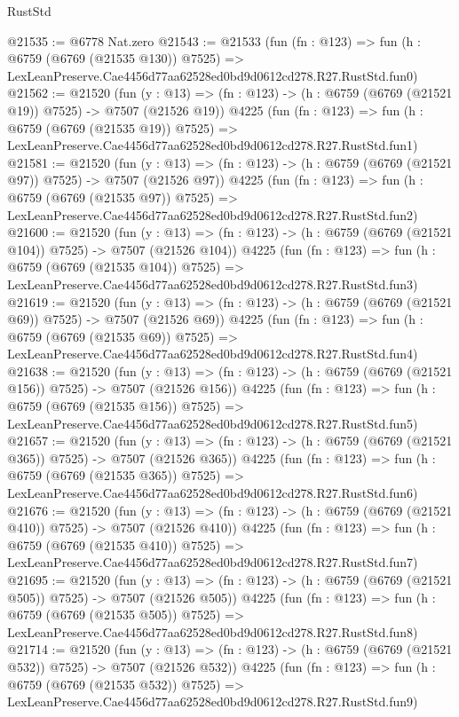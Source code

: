 \begin{lexlean}{RustStd}
\begin{coremodule}
@21535 := @6778 Nat.zero
@21543 := @21533
    (fun (fn : @123) =>
    fun (h : @6759 (@6769 (@21535 @130)) @7525) =>
    LexLeanPreserve.Cae4456d77aa62528ed0bd9d0612cd278.R27.RustStd.fun0)
@21562 := @21520
    (fun (y : @13) => (fn : @123) -> (h : @6759 (@6769 (@21521 @19)) @7525) -> @7507 (@21526 @19))
    @4225
    (fun (fn : @123) =>
    fun (h : @6759 (@6769 (@21535 @19)) @7525) =>
    LexLeanPreserve.Cae4456d77aa62528ed0bd9d0612cd278.R27.RustStd.fun1)
@21581 := @21520
    (fun (y : @13) => (fn : @123) -> (h : @6759 (@6769 (@21521 @97)) @7525) -> @7507 (@21526 @97))
    @4225
    (fun (fn : @123) =>
    fun (h : @6759 (@6769 (@21535 @97)) @7525) =>
    LexLeanPreserve.Cae4456d77aa62528ed0bd9d0612cd278.R27.RustStd.fun2)
@21600 := @21520
    (fun (y : @13) => (fn : @123) -> (h : @6759 (@6769 (@21521 @104)) @7525) -> @7507 (@21526 @104))
    @4225
    (fun (fn : @123) =>
    fun (h : @6759 (@6769 (@21535 @104)) @7525) =>
    LexLeanPreserve.Cae4456d77aa62528ed0bd9d0612cd278.R27.RustStd.fun3)
@21619 := @21520
    (fun (y : @13) => (fn : @123) -> (h : @6759 (@6769 (@21521 @69)) @7525) -> @7507 (@21526 @69))
    @4225
    (fun (fn : @123) =>
    fun (h : @6759 (@6769 (@21535 @69)) @7525) =>
    LexLeanPreserve.Cae4456d77aa62528ed0bd9d0612cd278.R27.RustStd.fun4)
@21638 := @21520
    (fun (y : @13) => (fn : @123) -> (h : @6759 (@6769 (@21521 @156)) @7525) -> @7507 (@21526 @156))
    @4225
    (fun (fn : @123) =>
    fun (h : @6759 (@6769 (@21535 @156)) @7525) =>
    LexLeanPreserve.Cae4456d77aa62528ed0bd9d0612cd278.R27.RustStd.fun5)
@21657 := @21520
    (fun (y : @13) => (fn : @123) -> (h : @6759 (@6769 (@21521 @365)) @7525) -> @7507 (@21526 @365))
    @4225
    (fun (fn : @123) =>
    fun (h : @6759 (@6769 (@21535 @365)) @7525) =>
    LexLeanPreserve.Cae4456d77aa62528ed0bd9d0612cd278.R27.RustStd.fun6)
@21676 := @21520
    (fun (y : @13) => (fn : @123) -> (h : @6759 (@6769 (@21521 @410)) @7525) -> @7507 (@21526 @410))
    @4225
    (fun (fn : @123) =>
    fun (h : @6759 (@6769 (@21535 @410)) @7525) =>
    LexLeanPreserve.Cae4456d77aa62528ed0bd9d0612cd278.R27.RustStd.fun7)
@21695 := @21520
    (fun (y : @13) => (fn : @123) -> (h : @6759 (@6769 (@21521 @505)) @7525) -> @7507 (@21526 @505))
    @4225
    (fun (fn : @123) =>
    fun (h : @6759 (@6769 (@21535 @505)) @7525) =>
    LexLeanPreserve.Cae4456d77aa62528ed0bd9d0612cd278.R27.RustStd.fun8)
@21714 := @21520
    (fun (y : @13) => (fn : @123) -> (h : @6759 (@6769 (@21521 @532)) @7525) -> @7507 (@21526 @532))
    @4225
    (fun (fn : @123) =>
    fun (h : @6759 (@6769 (@21535 @532)) @7525) =>
    LexLeanPreserve.Cae4456d77aa62528ed0bd9d0612cd278.R27.RustStd.fun9)

\end{coremodule}
\end{lexlean}
